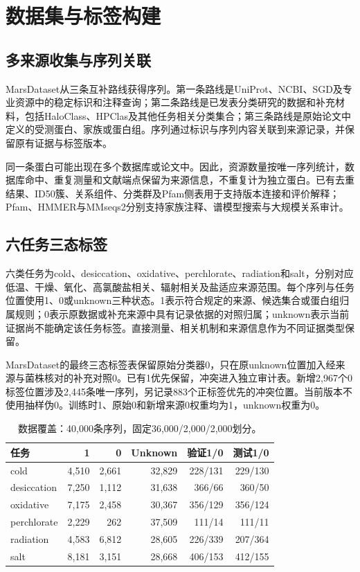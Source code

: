 \documentclass[conference]{IEEEtran}
\begin{document}
\section{数据集与标签构建}\label{sec:data}

\subsection{多来源收集与序列关联}

MarsDataset从三条互补路线获得序列。第一条路线是UniProt、NCBI、SGD及专业资源中的稳定标识和注释查询；第二条路线是已发表分类研究的数据和补充材料，包括HaloClass、HPClas及其他任务相关分类集合；第三条路线是原始论文中定义的受测蛋白、家族或蛋白组。序列通过标识与序列内容关联到来源记录，并保留原有证据与标签版本。

同一条蛋白可能出现在多个数据库或论文中。因此，资源数量按唯一序列统计，数据库命中、重复测量和文献端点保留为来源信息，不重复计为独立蛋白。已有去重结果、ID50簇、关系组件、分类群及Pfam侧表用于支持版本连接和评价解释；Pfam、HMMER与MMseqs2分别支持家族注释、谱模型搜索与大规模关系审计\cite{ref28,ref29,ref30}。

\subsection{六任务三态标签}

六类任务为cold、desiccation、oxidative、perchlorate、radiation和salt，分别对应低温、干燥、氧化、高氯酸盐相关、辐射相关及盐适应来源范围。每个序列与任务位置使用1、0或unknown三种状态。1表示符合规定的来源、候选集合或蛋白组归属规则；0表示原数据或补充来源中具有记录依据的对照归属；unknown表示当前证据尚不能确定该任务标签。直接测量、相关机制和来源信息作为不同证据类型保留。

MarsDataset的最终三态标签表保留原始分类器0，只在原unknown位置加入经来源与菌株核对的补充对照0。已有1优先保留，冲突进入独立审计表。新增2,967个0标签位置涉及2,445条唯一序列，另记录883个正标签优先的冲突位置。当前版本不使用抽样伪0。训练时1、原始0和新增来源0权重均为1，unknown权重为0。

\begin{table}[t]
\centering
\caption{数据覆盖：40,000条序列，固定36,000/2,000/2,000划分。}
\label{tab:1}
\footnotesize
\setlength{\tabcolsep}{3pt}
\begin{tabularx}{\columnwidth}{@{}Xrrrrr@{}}
\toprule
任务 & 1 & 0 & Unknown & 验证1/0 & 测试1/0 \\
\midrule
cold & 4,510 & 2,661 & 32,829 & 228/131 & 229/130 \\
desiccation & 7,250 & 1,112 & 31,638 & 366/66 & 360/50 \\
oxidative & 7,175 & 2,458 & 30,367 & 356/129 & 356/124 \\
perchlorate & 2,229 & 262 & 37,509 & 111/14 & 111/11 \\
radiation & 4,583 & 6,812 & 28,605 & 226/339 & 207/364 \\
salt & 8,181 & 3,151 & 28,668 & 406/153 & 412/155 \\
\bottomrule
\end{tabularx}
\end{table}
\end{document}
